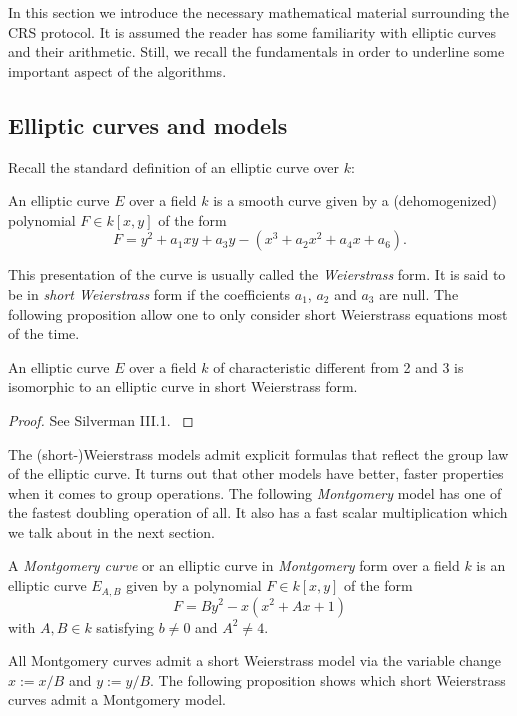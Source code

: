 \documentclass[../main/main.tex]{subfiles}
\begin{document}
In this section we introduce the necessary mathematical material surrounding the CRS protocol.
It is assumed the reader has some familiarity with elliptic curves and their arithmetic.
Still, we recall the fundamentals in order to underline some important aspect of the algorithms.


\subsection{Elliptic curves and models}
Recall the standard definition of an elliptic curve over $k$:
\begin{definition}
	An elliptic curve $E$ over a field $k$ is a smooth curve given by a (dehomogenized) polynomial $F\in k[x,y]$ of the form
	\[
		F = y^2 + a_1xy + a_3y - (x^3 +a_2 x^2 + a_4 x + a_6).
	\]
\end{definition}
This presentation of the curve is usually called the \textit{Weierstrass} form.
It is said to be in \textit{short Weierstrass} form if the coefficients $a_1$, $a_2$ and $a_3$ are null.
The following proposition allow one to only consider short Weierstrass equations most of the time.
\begin{proposition}
	An elliptic curve $E$ over a field $k$ of characteristic different from 2 and 3 is isomorphic to an elliptic curve in short Weierstrass form.
\end{proposition}
\begin{proof}
	See Silverman III.1. \cite{}
\end{proof}
The (short-)Weierstrass models admit explicit formulas that reflect the group law of the elliptic curve.
It turns out that other models have better, faster properties when it comes to group operations.
The following \textit{Montgomery} model has one of the fastest doubling operation of all.
It also has a fast scalar multiplication which we talk about in the next section.
\begin{definition}
	A \textit{Montgomery curve} or an elliptic curve in \textit{Montgomery} form over a field $k$ is an elliptic curve $E_{A, B}$ given by a polynomial $F\in k[x, y]$ of the form
	\[
		F = By^2 - x(x^2+Ax + 1)
	\]
	with $A, B\in k$ satisfying $b\neq 0$ and $A^2\neq 4$.
\end{definition}
All Montgomery curves admit a short Weierstrass model via the variable change $x := x/B$ and $y := y/B$.
The following proposition shows which short Weierstrass curves admit a Montgomery model.
\end{document}
